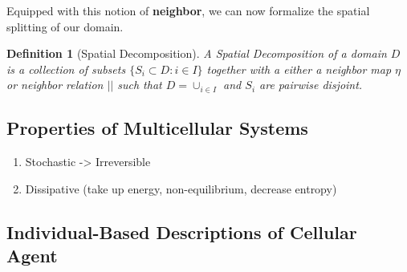 \documentclass{article}
\newtheorem{definition}{Definition}[section]
\begin{document}
Equipped with this notion of \textbf{neighbor}, we can now formalize the spatial splitting of our
domain.

\begin{definition}[Spatial Decomposition]
    A Spatial Decomposition of a domain $D$ is a collection of subsets
    $\{S_i\subset D: i\in I\}$ together with a either a neighbor map $\eta$ or neighbor relation
    $||$ such that $D=\cup_{i\in I}$ and $S_i$ are pairwise disjoint.
\end{definition}

\subsection{Properties of Multicellular Systems}
\label{subsec:introduction-properties}

\begin{enumerate}
    \item Stochastic -> Irreversible
    \item Dissipative (take up energy, non-equilibrium, decrease entropy)
\end{enumerate}


\subsection{Individual-Based Descriptions of Cellular Agent}
\label{subsec:introduction-individual-descriptions}

\pagebreak
\pagebreak
\end{document}
